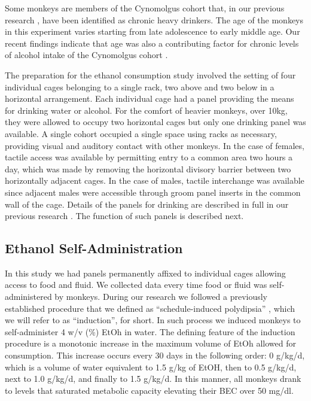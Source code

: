\documentclass{bmcart}
\begin{document}
Some monkeys are members of the Cynomolgus cohort that, in our previous
research \cite{grant2008drinking}, have been identified as chronic heavy drinkers. 
The age of the monkeys in this experiment varies starting from late
adolescence to early middle age. Our recent findings indicate that age was also
a contributing factor for chronic levels of alcohol intake of the Cynomolgus
cohort \cite{daunais2014monkey}.

The preparation for the ethanol consumption study involved the setting of four
individual cages belonging to a single rack, two above and two below in a
horizontal arrangement. Each individual cage had a panel providing the means
for drinking water or alcohol. For the comfort of heavier monkeys, over 10kg, they
were allowed to occupy two horizontal cages but only one drinking panel was
available. A single cohort occupied a single space using racks as necessary,
providing visual and auditory contact with other monkeys. In the case of females,
tactile access was available by permitting entry to a common area two hours a
day, which was made by removing the horizontal divisory barrier between two
horizontally adjacent cages. In the case of males,
tactile interchange was available since adjacent males were accessible through
groom panel inserts in the common wall of the cage. Details of the panels for
drinking are described in full in our previous research
\cite{vivian2001induction,grant2008drinking}. The function of such panels is
described next.


\subsection*{Ethanol Self-Administration}

In this study we had panels permanently affixed to individual cages allowing 
access to food and fluid.
We collected data every time food or fluid was self-administered by monkeys.
During our research we followed a previously established procedure that we
defined as ``schedule-induced polydipsia'' \cite{grant2008drinking}, which we
will refer to as ``induction'', for short. In such process we induced monkeys 
to self-administer 4 w/v (\%) EtOh in water. The defining feature of the
induction procedure is a monotonic increase in the maximum volume of EtOh
allowed for consumption. This increase occurs every 30 days in the following
order: 0 g/kg/d, which is a volume of water equivalent to 1.5 g/kg of EtOH, then
to 0.5 g/kg/d, next to 1.0 g/kg/d, and finally to 1.5 g/kg/d. In this manner,
all monkeys drank to levels that saturated metabolic capacity elevating
their BEC over 50 mg/dl. 
\end{document}
